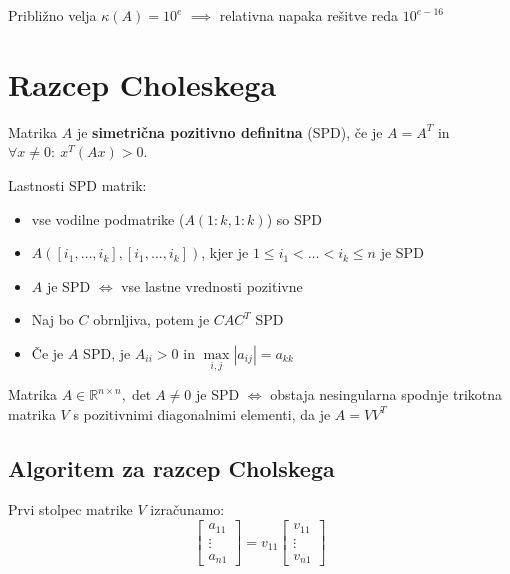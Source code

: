 \begin{multicols}{5}
Približno velja $\kappa(A) = 10^e$ $\implies$ relativna napaka rešitve reda $10^{e-16}$

\section{Razcep Choleskega}
Matrika $A$ je \textbf{simetrična pozitivno definitna} (SPD), če je $A = A^T$ in $\forall x \neq 0:\ x^T(Ax) > 0$.

Lastnosti SPD matrik:
\begin{itemize}
	\item vse vodilne podmatrike ($A(1:k, 1:k)$) so SPD
	\item $A([i_1, \dots, i_k], [i_1, \dots, i_k])$, kjer je $1 \leq i_1 < \dots < i_k \leq n$ je SPD
	\item $A$ je SPD $\iff$ vse lastne vrednosti pozitivne
	\item Naj bo $C$ obrnljiva, potem je $CAC^T$ SPD
	\item Če je $A$ SPD, je $A_{ii} > 0$ in $\max\limits_{i,j} |a_{ij}| = a_{kk}$
\end{itemize}

Matrika $A \in \mathbb{R}^{n\times n}, \det A \neq 0$ je SPD $\iff$ obstaja nesingularna spodnje trikotna matrika $V$ s pozitivnimi diagonalnimi elementi, da je $A = VV^T$

\subsection{Algoritem za razcep Cholskega}
Prvi stolpec matrike $V$ izračunamo:
\[
\begin{bmatrix}
	a_{11} \\ \vdots \\ a_{n1}
\end{bmatrix}
=
v_{11} \begin{bmatrix}
	v_{11} \\ \vdots \\ v_{n1}
\end{bmatrix}
\]


\end{multicols}
